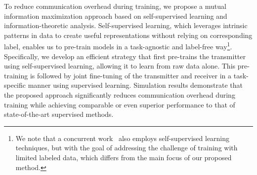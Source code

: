 
To reduce communication overhead during training, we propose a mutual information maximization approach based on self-supervised learning and information-theoretic analysis. Self-supervised learning, which leverages intrinsic patterns in data to create useful representations without relying on corresponding label, enables us to pre-train models in a task-agnostic and label-free way\footnote{We note that a concurrent work~\cite{gu2024self} also employs self-supervised learning techniques, but with the goal of addressing the challenge of training with limited labeled data, which differs from the main focus of our proposed method.}. Specifically, we develop an efficient strategy that first pre-trains the transmitter using self-supervised learning, allowing it to learn from raw data alone. This pre-training is followed by joint fine-tuning of the transmitter and receiver in a task-specific manner using supervised learning. Simulation results demonstrate that the proposed approach significantly reduces communication overhead during training while achieving comparable or even superior performance to that of state-of-the-art supervised methods. 

